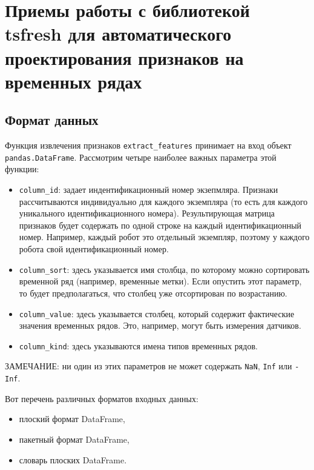 \documentclass[%
	11pt,
	a4paper,
	utf8,
		]{article}
\begin{document}
\section{Приемы работы с библиотекой tsfresh для автоматического проектирования признаков на временных рядах}

\subsection{Формат данных}

Функция извлечения признаков \texttt{extract\_features} принимает на вход объект \texttt{pandas.DataFrame}. Рассмотрим четыре наиболее важных параметра этой функции:
\begin{itemize}
	\item \texttt{column\_id}: задает индентификационный номер экзепмляра. Признаки рассчитываются индивидуально для каждого экземпляра (то есть для каждого уникального идентификационного номера). Результирующая матрица признаков будет содержать по одной строке на каждый идентификационный номер. Например, каждый робот это отдельный экземпляр, поэтому у каждого робота свой идентификационный номер.
	
	\item \texttt{column\_sort}: здесь указывается имя столбца, по которому можно сортировать временной ряд (например, временные метки). Если опустить этот параметр, то будет предполагаться, что столбец уже отсортирован по возрастанию.
	
	\item \texttt{column\_value}: здесь указывается столбец, который содержит фактические значения временных рядов. Это, например, могут быть измерения датчиков.
	
	\item \texttt{column\_kind}: здесь указываются имена типов временных рядов.
\end{itemize}

ЗАМЕЧАНИЕ: ни один из этих параметров не может содержать \texttt{NaN}, \texttt{Inf} или \texttt{-Inf}.

Вот перечень различных форматов входных данных:
\begin{itemize}
	\item плоский формат DataFrame,
	
	\item пакетный формат DataFrame,
	
	\item словарь плоских DataFrame.
\end{itemize}
\end{document}
